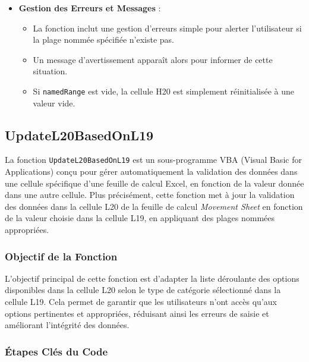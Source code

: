 \documentclass[a4paper, oneside, 12pt, final]{extreport}
\begin{document}
\begin{itemize}
    \item \textbf{Gestion des Erreurs et Messages} :
    \begin{itemize}
        \item La fonction inclut une gestion d'erreurs simple pour alerter l'utilisateur si la plage nommée spécifiée n'existe pas.
        \item Un message d'avertissement apparaît alors pour informer de cette situation.
        \item Si \texttt{namedRange} est vide, la cellule H20 est simplement réinitialisée à une valeur vide.
    \end{itemize}
\end{itemize}


\subsection{UpdateL20BasedOnL19}
La fonction \texttt{UpdateL20BasedOnL19} est un sous-programme VBA (Visual Basic for Applications) conçu pour gérer automatiquement la validation des données dans une cellule spécifique d'une feuille de calcul Excel, en fonction de la valeur donnée dans une autre cellule. Plus précisément, cette fonction met à jour la validation des données dans la cellule L20 de la feuille de calcul \textit{Movement Sheet} en fonction de la valeur choisie dans la cellule L19, en appliquant des plages nommées appropriées.

\subsubsection{Objectif de la Fonction}
L'objectif principal de cette fonction est d'adapter la liste déroulante des options disponibles dans la cellule L20 selon le type de catégorie sélectionné dans la cellule L19. Cela permet de garantir que les utilisateurs n'ont accès qu'aux options pertinentes et appropriées, réduisant ainsi les erreurs de saisie et améliorant l'intégrité des données.

\subsubsection{Étapes Clés du Code}
\end{document}
